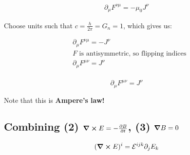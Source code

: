 \begin{align*}
    \partial_\mu F^{\nu \mu} = - \mu_0 J^{\nu}
\end{align*}

Choose units such that $c = \frac{h}{2 \pi} = G_n = 1$, which gives us:


\begin{align*}
    &\partial_\mu F^{\nu \mu} = -  J^{\nu} \\
    &\text{$F$ is antisymmetric, so flipping indices} \\
    &\partial_\mu F^{\mu \nu} =  J^{\nu} \\
\end{align*}

\begin{equation}
    \boxed{ \partial_\mu F^{\mu \nu} =  J^{\nu} }
\end{equation}

Note that this is \textbf{Ampere's law!}

\subsection{Combining (2) $\curl E = - \pdv{B}{t}$, (3) $\grad B = 0$}

\begin{align*}
    (\curl E)^i = \mathcal{E}^{ijk} \partial_j E_k
\end{align*}

